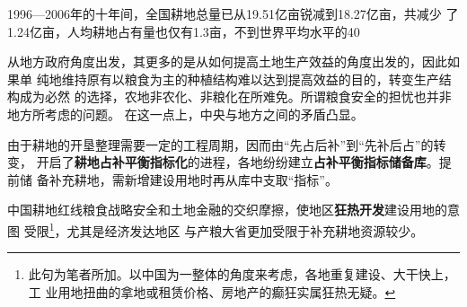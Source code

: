 1996—2006年的十年间，全国耕地总量已从19.51亿亩锐减到18.27亿亩，共减少
了1.24亿亩，人均耕地占有量也仅有1.3亩，不到世界平均水平的40%

从地方政府角度出发，其更多的是从如何提高土地生产效益的角度出发的，因此如果单
纯地维持原有以粮食为主的种植结构难以达到提高效益的目的，转变生产结构成为必然
的选择，农地非农化、非粮化在所难免。所谓粮食安全的担忧也并非地方所考虑的问题。
在这一点上，中央与地方之间的矛盾凸显。

由于耕地的开垦整理需要一定的工程周期，因而由“先占后补”到“先补后占”的转变，
开启了\textbf{耕地占补平衡指标化}的进程，各地纷纷建立\textbf{占补平衡指标储备库}。提前储
备补充耕地，需新增建设用地时再从库中支取“指标”。

中国耕地红线粮食战略安全和土地金融的交织摩擦，使地区\textbf{狂热开发}建设用地的意图
受限\footnote{此句为笔者所加。以中国为一整体的角度来考虑，各地重复建设、大干快上，工
  业用地扭曲的拿地或租赁价格、房地产的癫狂实属狂热无疑。}，尤其是经济发达地区
与产粮大省更加受限于补充耕地资源较少。
